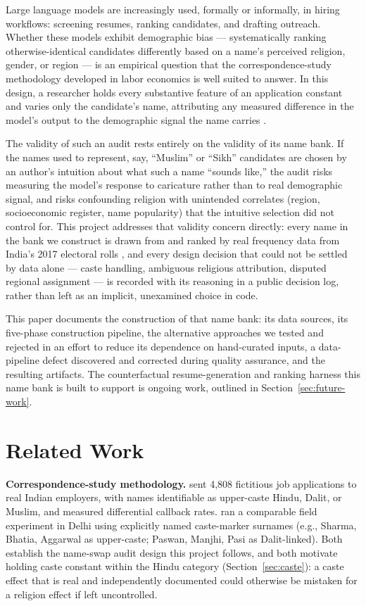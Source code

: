 \documentclass[11pt]{article}
\begin{document}
Large language models are increasingly used, formally or informally, in hiring workflows: screening resumes, ranking candidates, and drafting outreach. Whether these models exhibit demographic bias --- systematically ranking otherwise-identical candidates differently based on a name's perceived religion, gender, or region --- is an empirical question that the correspondence-study methodology developed in labor economics is well suited to answer. In this design, a researcher holds every substantive feature of an application constant and varies only the candidate's name, attributing any measured difference in the model's output to the demographic signal the name carries \citep{thoratAttewell2007, banerjee2009}.

The validity of such an audit rests entirely on the validity of its name bank. If the names used to represent, say, ``Muslim'' or ``Sikh'' candidates are chosen by an author's intuition about what such a name ``sounds like,'' the audit risks measuring the model's response to caricature rather than to real demographic signal, and risks confounding religion with unintended correlates (region, socioeconomic register, name popularity) that the intuitive selection did not control for. This project addresses that validity concern directly: every name in the bank we construct is drawn from and ranked by real frequency data from India's 2017 electoral rolls \citep{soodDhingra2023}, and every design decision that could not be settled by data alone --- caste handling, ambiguous religious attribution, disputed regional assignment --- is recorded with its reasoning in a public decision log, rather than left as an implicit, unexamined choice in code.

This paper documents the construction of that name bank: its data sources, its five-phase construction pipeline, the alternative approaches we tested and rejected in an effort to reduce its dependence on hand-curated inputs, a data-pipeline defect discovered and corrected during quality assurance, and the resulting artifacts. The counterfactual resume-generation and ranking harness this name bank is built to support is ongoing work, outlined in Section~\ref{sec:future-work}.

\section{Related Work}

\textbf{Correspondence-study methodology.} \citet{thoratAttewell2007} sent 4,808 fictitious job applications to real Indian employers, with names identifiable as upper-caste Hindu, Dalit, or Muslim, and measured differential callback rates. \citet{banerjee2009} ran a comparable field experiment in Delhi using explicitly named caste-marker surnames (e.g., Sharma, Bhatia, Aggarwal as upper-caste; Paswan, Manjhi, Pasi as Dalit-linked). Both establish the name-swap audit design this project follows, and both motivate holding caste constant within the Hindu category (Section~\ref{sec:caste}): a caste effect that is real and independently documented could otherwise be mistaken for a religion effect if left uncontrolled.
\end{document}
